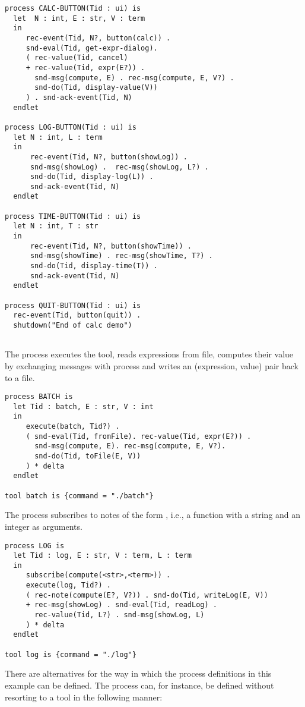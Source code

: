 \small
\begin{verbatim}
process CALC-BUTTON(Tid : ui) is
  let  N : int, E : str, V : term
  in
     rec-event(Tid, N?, button(calc)) .
     snd-eval(Tid, get-expr-dialog).
     ( rec-value(Tid, cancel)
     + rec-value(Tid, expr(E?)) .
       snd-msg(compute, E) . rec-msg(compute, E, V?) .
       snd-do(Tid, display-value(V))
     ) . snd-ack-event(Tid, N)
  endlet

process LOG-BUTTON(Tid : ui) is
  let N : int, L : term
  in
      rec-event(Tid, N?, button(showLog)) .
      snd-msg(showLog) .  rec-msg(showLog, L?) .
      snd-do(Tid, display-log(L)) .
      snd-ack-event(Tid, N)
  endlet

process TIME-BUTTON(Tid : ui) is
  let N : int, T : str
  in
      rec-event(Tid, N?, button(showTime)) .
      snd-msg(showTime) . rec-msg(showTime, T?) .
      snd-do(Tid, display-time(T)) .
      snd-ack-event(Tid, N)
  endlet

process QUIT-BUTTON(Tid : ui) is
  rec-event(Tid, button(quit)) .
  shutdown("End of calc demo")


\end{verbatim}
\noindent
\normalsize
 The  process executes the  tool,
 reads expressions from file, computes their value by exchanging messages
 with process  and writes an (expression, value) pair
 back to a file.

\small
\begin{verbatim}
process BATCH is
  let Tid : batch, E : str, V : int
  in
     execute(batch, Tid?) .
     ( snd-eval(Tid, fromFile). rec-value(Tid, expr(E?)) .
       snd-msg(compute, E). rec-msg(compute, E, V?).
       snd-do(Tid, toFile(E, V))
     ) * delta
  endlet

tool batch is {command = "./batch"}

\end{verbatim}
\noindent
\normalsize
 The  process subscribes to notes of the form ,
 i.e., a function  with a string and an integer as arguments.

\small
\begin{verbatim}
process LOG is
  let Tid : log, E : str, V : term, L : term
  in
     subscribe(compute(<str>,<term>)) .
     execute(log, Tid?) .
     ( rec-note(compute(E?, V?)) . snd-do(Tid, writeLog(E, V))
     + rec-msg(showLog) . snd-eval(Tid, readLog) .
       rec-value(Tid, L?) . snd-msg(showLog, L)
     ) * delta
  endlet

tool log is {command = "./log"}

\end{verbatim}
\noindent
\normalsize
 There are alternatives for the way in which the process definitions
 in this example can be defined. The  process can, for instance,
 be defined without resorting to a tool in the following manner:

